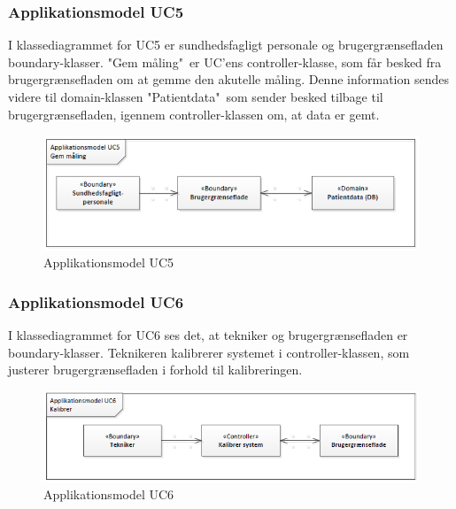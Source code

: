 \subsubsection{Applikationsmodel UC5}
I klassediagrammet for UC5 er sundhedsfagligt personale og brugergrænsefladen boundary-klasser. "Gem måling"\ er UC'ens controller-klasse, som får besked fra brugergrænsefladen om at gemme den akutelle måling. Denne information sendes videre til domain-klassen "Patientdata"\, som sender besked tilbage til brugergrænsefladen, igennem controller-klassen om, at data er gemt. 
\begin{figure}[H]
\centering
\includegraphics[scale=0.70]{app5.PNG}
\caption{Applikationsmodel UC5}
\end{figure}

\subsubsection{Applikationsmodel UC6}
I klassediagrammet for UC6 ses det, at tekniker og brugergrænsefladen er boundary-klasser. Teknikeren kalibrerer systemet i controller-klassen, som justerer brugergrænsefladen i forhold til kalibreringen. 
\begin{figure}[H]
\centering
\includegraphics[scale=0.70]{app6.PNG}
\caption{Applikationsmodel UC6}
\end{figure}


